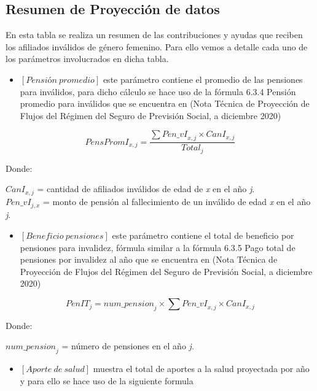 \documentclass[
  letterpaper,
  DIV=11,
  numbers=noendperiod]{scrreprt}
\providecommand{\tightlist}{%
  \setlength{\itemsep}{0pt}\setlength{\parskip}{0pt}}\usepackage{longtable,booktabs,array}
\begin{document}
\hypertarget{resumen-de-proyecciuxf3n-de-datos-2}{%
\subsection{Resumen de Proyección de
datos}\label{resumen-de-proyecciuxf3n-de-datos-2}}

En esta tabla se realiza un resumen de las contribuciones y ayudas que
reciben los afiliados inválidos de género femenino. Para ello vemos a
detalle cada uno de los parámetros involucrados en dicha tabla.

\begin{itemize}
\tightlist
\item
  \([Pensión\ promedio]\) este parámetro contiene el promedio de las
  pensiones para inválidos, para dicho cálculo se hace uso de la fórmula
  6.3.4 Pensión promedio para inválidos que se encuentra en (Nota
  Técnica de Proyección de Flujos del Régimen del Seguro de Previsión
  Social, a diciembre 2020)
\end{itemize}

\begin{equation}
{PensPromI}_{x,j}=\frac{\sum{{Pen\_vI}_{x,j}\times{CanI}_{x,j}}}{Total_j}
\end{equation}

Donde:

\({CanI}_{x,j}\) = cantidad de afiliados inválidos de edad de \emph{x}
en el año \emph{j}.\\
\({Pen\_vI}_{j,x}\) = monto de pensión al fallecimiento de un inválido
de edad \emph{x} en el año \emph{j}.

\begin{itemize}
\tightlist
\item
  \([Beneficio\ pensiones]\) este parámetro contiene el total de
  beneficio por pensiones para invalidez, fórmula similar a la fórmula
  6.3.5 Pago total de pensiones por invalidez al año que se encuentra en
  (Nota Técnica de Proyección de Flujos del Régimen del Seguro de
  Previsión Social, a diciembre 2020)
\end{itemize}

\begin{equation}
{PenIT}_{j}={num\_pension}_j\times\sum{{Pen\_vI}_{x,j}\times{CanI}_{x,j}}
\label{eq:penit}
\end{equation}

Donde:

\({num\_pension}_j\) = número de pensiones en el año \emph{j}.

\begin{itemize}
\tightlist
\item
  \([Aporte\ de\ salud]\) muestra el total de aportes a la salud
  proyectada por año y para ello se hace uso de la siguiente formula
\end{itemize}
\end{document}
